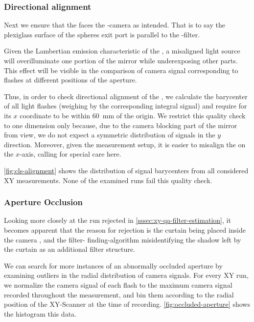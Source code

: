 \subsubsection{Directional alignment}

Next we ensure that the \CLS faces the \FD-camera as intended. That is to say
the plexiglass surface of the spheres exit port is parallel to the \UV-filter. 

Given the Lambertian emission characteristic of the \CLS, a misaligned light
source will overilluminate one portion of the mirror while underexposing
other parts. This effect will be visible in the comparison of camera signal 
corresponding to flashes at different positions of the aperture.

Thus, in order to check directional alignment of the \CLS, we calculate the
barycenter of all light flashes (weighing by the corresponding integral \FD 
signal) and require for its $x$ coordinate to be within \SI{60}{\milli\meter} of
the origin. We restrict this quality check to one dimension only because, due to
the camera blocking part of the mirror from view, we do not expect a symmetric 
distribution of signals in the $y$ direction. Moreover, given the measurement 
setup, it is easier to misalign the \CLS on the $x$-axis, calling for special 
care here.

\cref{fig:cls-alignment} shows the distribution of signal barycenters from all 
considered XY measurements. None of the examined runs fail this quality check.

\subsubsection{Aperture Occlusion}
\label{sssec:xy-qa-aperture-occlusion}

Looking more closely at the run rejected in 
\cref{sssec:xy-qa-filter-estimation}, it becomes apparent that the reason for 
rejection is the curtain being placed inside the camera \FOV, and the filter-
finding-algorithm misidentifying the shadow left by the curtain as an additional
filter structure. 

We can search for more instances of an abnormally occluded aperture by examining
outliers in the radial distribution of camera signals. For every XY run, we 
normalize the camera signal of each flash to the maximum camera signal recorded 
throughout the measurement, and bin them according to the radial position of the
XY-Scanner at the time of recording. \cref{fig:occluded-aperture} shows the 
histogram this data.

